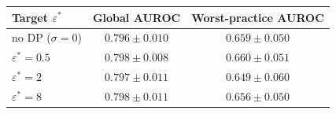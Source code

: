 \begin{tabular}{lcc}
  \toprule
  Target $\varepsilon^{*}$ & Global AUROC & Worst-practice AUROC \\
  \midrule
  no DP ($\sigma = 0$)      & $0.796 \pm 0.010$ & $0.659 \pm 0.050$ \\
  $\varepsilon^{*} = 0.5$   & $0.798 \pm 0.008$ & $0.660 \pm 0.051$ \\
  $\varepsilon^{*} = 2$     & $0.797 \pm 0.011$ & $0.649 \pm 0.060$ \\
  $\varepsilon^{*} = 8$     & $0.798 \pm 0.011$ & $0.656 \pm 0.050$ \\
  \bottomrule
\end{tabular}
